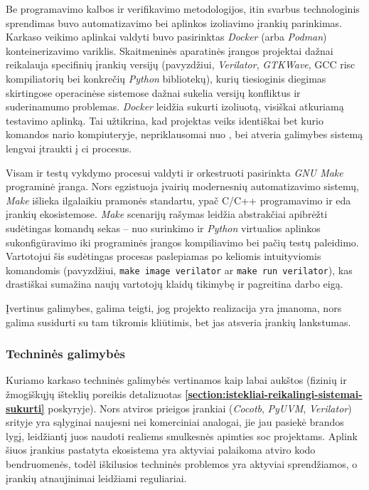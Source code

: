 Be programavimo kalbos ir verifikavimo metodologijos, itin svarbus technologinis sprendimas buvo automatizavimo bei aplinkos izoliavimo įrankių parinkimas. Karkaso veikimo aplinkai valdyti buvo pasirinktas \textit{Docker} (arba \textit{Podman}) konteinerizavimo variklis. Skaitmeninės aparatinės įrangos  projektai dažnai reikalauja specifinių įrankių versijų (pavyzdžiui, \textit{Verilator}, \textit{GTKWave}, GCC \gls{risc} kompiliatorių bei konkrečių \textit{Python} bibliotekų), kurių tiesioginis diegimas skirtingose operacinėse sistemose dažnai sukelia versijų konfliktus ir suderinamumo problemas. \textit{Docker} leidžia sukurti izoliuotą, visiškai atkuriamą  testavimo aplinką. Tai užtikrina, kad projektas veiks identiškai bet kurio komandos nario kompiuteryje, nepriklausomai nuo , bei atveria galimybes sistemą lengvai įtraukti į \gls{ci} procesus.

Visam  ir testų vykdymo procesui valdyti ir orkestruoti pasirinkta \textit{GNU Make} programinė įranga. Nors egzistuoja įvairių modernesnių automatizavimo sistemų, \textit{Make} išlieka ilgalaikiu pramonės standartu, ypač C/C++ programavimo ir \gls{eda} įrankių ekosistemose. \textit{Make} scenarijų rašymas leidžia abstrakčiai apibrėžti sudėtingas komandų sekas -- nuo  surinkimo ir \textit{Python} virtualios aplinkos sukonfigūravimo iki programinės įrangos kompiliavimo bei pačių testų paleidimo. Vartotojui šis sudėtingas procesas paslepiamas po keliomis intuityviomis komandomis (pavyzdžiui, \texttt{make image verilator} ar \texttt{make run verilator}), kas drastiškai sumažina naujų vartotojų klaidų tikimybę ir pagreitina darbo eigą.

Įvertinus galimybes, galima teigti, jog projekto realizacija yra įmanoma, nors galima susidurti su tam tikromis kliūtimis, bet jas atsveria įrankių lankstumas.

\subsubsection{Techninės galimybės}

Kuriamo karkaso techninės galimybės vertinamos kaip labai aukštos (fizinių ir žmogiškųjų išteklių poreikis detalizuotas \textbf{\ref{section:istekliai-reikalingi-sistemai-sukurti}} poskyryje). Nors atviros prieigos įrankiai (\textit{Cocotb}, \textit{PyUVM}, \textit{Verilator})  srityje yra sąlyginai naujesni nei komerciniai analogai, jie jau pasiekė brandos lygį, leidžiantį juos naudoti realiems smulkesnės apimties \gls{soc} projektams. Aplink šiuos įrankius pastatyta ekosistema yra aktyviai palaikoma atviro kodo bendruomenės, todėl iškilusios techninės problemos yra aktyviai sprendžiamos, o įrankių atnaujinimai leidžiami reguliariai.

